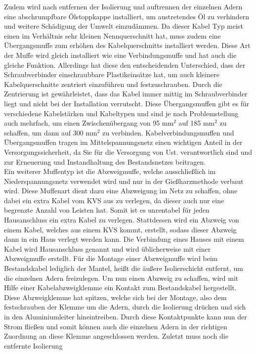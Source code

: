 Zudem wird nach entfernen der Isolierung und auftrennen der einzelnen Adern eine abschrumpfbare Ölstoppkappe installiert, um austretendes Öl zu verhindern 
und weitere Schädigung der Umwelt einzudämmen. Da dieser Kabel Typ meist einen im Verhältnis sehr kleinen Nennquerschnitt hat, muss zudem eine 
Übergangsmuffe zum erhöhen des Kabelquerschnitts installiert werden. Diese Art der Muffe wird gleich installiert wie eine Verbindungsmuffe und hat auch die 
gleiche Funktion. Allerdings hat diese den entscheidenden Unterschied, dass der Schraubverbinder einschraubbare Plastikeinsätze hat, um auch kleinere 
Kabelquerschnitte zentriert einzuführen und festzuschrauben. Durch die Zentrierung ist gewährleistet, dass das Kabel immer mittig im Schraubverbinder 
liegt und nicht bei der Installation verrutscht. Diese Übergangsmuffen gibt es für verschiedene Kabelstärken und Kabeltypen und sind je nach Problemstellung 
auch mehrfach, \zB um einen Zwischenübergang von 95 mm$^2$ auf 185 mm$^2$ zu schaffen, um dann auf 300 mm$^2$ zu verbinden. Kabelverbindungsmuffen und 
Übergangsmuffen tragen im Mittelspannungsnetz einen wichtigen Anteil in der Versorgungssicherheit, da Sie für die Versorgung von Ust. verantwortlich 
sind und zur Erneuerung und Instandhaltung des Bestandsnetzes beitragen.\\
Ein weiterer Muffentyp ist die Abzweigmuffe, welche ausschließlich im Niederspannungsnetz verwendet wird und nur in der Gießharzmethode verbaut wird. 
Diese Muffenart dient dazu eine Abzweigung im Netz zu schaffen, ohne dabei ein extra Kabel vom KVS aus zu verlegen, da dieser auch nur eine begrenzte 
Anzahl von Leisten hat. Somit ist es unrentabel für jeden Hausanschluss ein extra Kabel zu verlegen. Stattdessen wird ein Abzweig von einem Kabel, 
welches aus einem KVS kommt, erstellt, sodass dieser Abzweig dann in ein Haus verlegt werden kann. Die Verbindung eines Hauses mit einem Kabel wird 
Hausanschluss genannt und wird üblicherweise mit einer Abzweigmuffe erstellt. Für die Montage einer Abzweigmuffe wird beim Bestandskabel lediglich der 
Mantel, heißt die äußere Isolierschicht entfernt, um die einzelnen Adern freizulegen. Um nun einen Abzweig zu schaffen, wird mit Hilfe einer 
Kabelabzweigklemme ein Kontakt zum Bestandskabel hergestellt. Diese Abzweigklemme hat spitzen, welche sich bei der Montage, also dem festschrauben der
Klemme um die Adern, durch die Isolierung drücken und sich in den Aluminiumleiter hineintreiben. Durch diese Kontaktpunkte kann nun der Strom fließen 
und somit können auch die einzelnen Adern in der richtigen Zuordnung an diese Klemme angeschlossen werden. Zuletzt muss noch die entfernte Isolierung 

